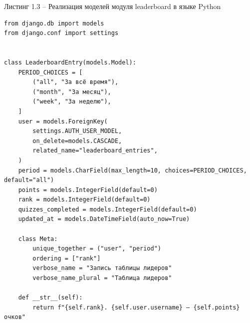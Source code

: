 \documentclass[14pt,a4paper]{extreport}
\begin{document}
\newpage

\begin{flushright}
Листинг 1.3 -- Реализация моделей модуля leaderboard в языке Python
\end{flushright}

\begin{lstlisting}
from django.db import models
from django.conf import settings


class LeaderboardEntry(models.Model):
    PERIOD_CHOICES = [
        ("all", "За всё время"),
        ("month", "За месяц"),
        ("week", "За неделю"),
    ]
    user = models.ForeignKey(
        settings.AUTH_USER_MODEL,
        on_delete=models.CASCADE,
        related_name="leaderboard_entries",
    )
    period = models.CharField(max_length=10, choices=PERIOD_CHOICES, default="all")
    points = models.IntegerField(default=0)
    rank = models.IntegerField(default=0)
    quizzes_completed = models.IntegerField(default=0)
    updated_at = models.DateTimeField(auto_now=True)

    class Meta:
        unique_together = ("user", "period")
        ordering = ["rank"]
        verbose_name = "Запись таблицы лидеров"
        verbose_name_plural = "Таблица лидеров"

    def __str__(self):
        return f"{self.rank}. {self.user.username} — {self.points} очков"
\end{lstlisting}

\renewcommand{\bibname}{Список использованных источников}
\end{document}
